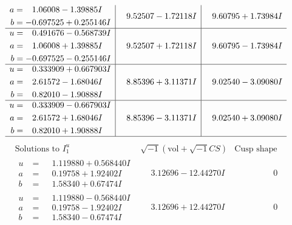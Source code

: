\documentclass[1p]{elsarticle_modified}
\theoremstyle{definition}
\newcommand{\I}{\sqrt{-1}}
\begin{document}
$$\begin{array}{c|c|c}
\begin{aligned}
a &= \phantom{-}1.06008 - 1.39885 I \\
b &= -0.697525 + 0.255146 I\end{aligned}
 & \phantom{-}9.52507 - 1.72118 I & \phantom{-}9.60795 + 1.73984 I \\ \hline\begin{aligned}
u &= \phantom{-}0.491676 - 0.568739 I \\
a &= \phantom{-}1.06008 + 1.39885 I \\
b &= -0.697525 - 0.255146 I\end{aligned}
 & \phantom{-}9.52507 + 1.72118 I & \phantom{-}9.60795 - 1.73984 I \\ \hline\begin{aligned}
u &= \phantom{-}0.333909 + 0.667903 I \\
a &= \phantom{-}2.61572 - 1.68046 I \\
b &= \phantom{-}0.82010 - 1.90888 I\end{aligned}
 & \phantom{-}8.85396 + 3.11371 I & \phantom{-}9.02540 - 3.09080 I \\ \hline\begin{aligned}
u &= \phantom{-}0.333909 - 0.667903 I \\
a &= \phantom{-}2.61572 + 1.68046 I \\
b &= \phantom{-}0.82010 + 1.90888 I\end{aligned}
 & \phantom{-}8.85396 - 3.11371 I & \phantom{-}9.02540 + 3.09080 I\\
 \hline 
 \end{array}$$\newpage$$\begin{array}{c|c|c}  
\text{Solutions to }I^u_{1}& \I (\text{vol} + \sqrt{-1}CS) & \text{Cusp shape}\\
 \hline 
\begin{aligned}
u &= \phantom{-}1.119880 + 0.568440 I \\
a &= \phantom{-}0.19758 + 1.92402 I \\
b &= \phantom{-}1.58340 + 0.67474 I\end{aligned}
 & \phantom{-}3.12696 - 12.44270 I & \phantom{-0.000000 } 0 \\ \hline\begin{aligned}
u &= \phantom{-}1.119880 - 0.568440 I \\
a &= \phantom{-}0.19758 - 1.92402 I \\
b &= \phantom{-}1.58340 - 0.67474 I\end{aligned}
 & \phantom{-}3.12696 + 12.44270 I & \phantom{-0.000000 } 0 \\ \hline\begin{aligned}

\end{aligned}
\end{array}$$
\end{document}
